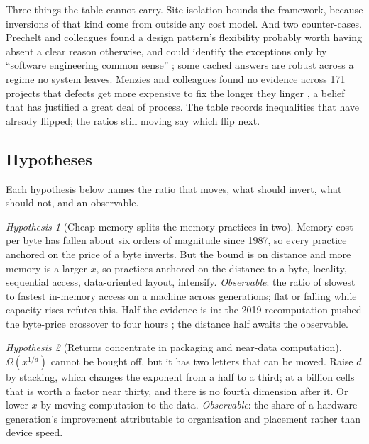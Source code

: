 \documentclass[11pt,oneside]{article}
\theoremstyle{definition}
\theoremstyle{remark}
\newtheorem{hyp}{Hypothesis}
\begin{document}
Three things the table cannot carry. Site isolation bounds the framework, because inversions of that
kind come from outside any cost model. And two counter-cases. Prechelt and colleagues found a design pattern's flexibility probably worth
having absent a clear reason otherwise, and could identify the exceptions only by
``software engineering common sense'' \cite{prechelt2001}; some cached answers are robust
across a regime no system leaves. Menzies and colleagues found no evidence across 171
projects that defects get more expensive to fix the longer they linger \cite{menzies2017},
a belief that has justified a great deal of process. The table records inequalities that
have already flipped; the ratios still moving say which flip next.

\subsection{Hypotheses}\label{sec:forward}

Each hypothesis below names the ratio that moves, what should invert, what should not, and
an observable.

\begin{hyp}[Cheap memory splits the memory practices in two]
Memory cost per byte has fallen about six orders of magnitude since 1987, so every
practice anchored on the price of a byte inverts. But the bound is on distance and more
memory is a larger $x$, so practices anchored on the distance to a byte, locality,
sequential access, data-oriented layout, intensify. \emph{Observable}: the ratio of slowest
to fastest in-memory access on a machine across generations; flat or falling while
capacity rises refutes this. Half the evidence is in: the 2019 recomputation pushed the
byte-price crossover to four hours \cite{appuswamy2019}; the distance half awaits the
observable.
\end{hyp}

\begin{hyp}[Returns concentrate in packaging and near-data computation]
$\Omega(x^{1/d})$ cannot be bought off, but it has two letters that can be moved. Raise
$d$ by stacking, which changes the exponent from a half to a third; at a billion cells
that is worth a factor near thirty, and there is no fourth dimension after it. Or lower $x$
by moving computation to the data.
\emph{Observable}: the share of a hardware generation's improvement attributable to
organisation and placement rather than device speed.
\end{hyp}
\end{document}

